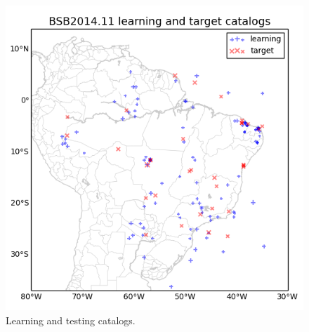 \documentclass[draft, grl]{agutex}
\begin{document}
\begin{figure}
	\includegraphics[width=0.99\linewidth]{z_img_helmstetter_catalogues}
	\caption{Learning and testing catalogs.}
	\label{fig_helmstetter_catalogues}
\end{figure}



\end{document}
